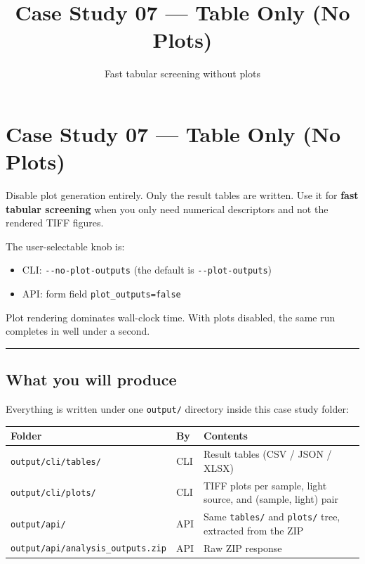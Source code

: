 \documentclass[
  11pt,
]{article}
\title{Case Study 07 — Table Only (No Plots)}
\subtitle{Fast tabular screening without plots}
\author{}
\date{}
\providecommand{\tightlist}{
  \setlength{\itemsep}{0pt}\setlength{\parskip}{0pt}}
\begin{document}
\maketitle

{
\hypersetup{linkcolor=}
\setcounter{tocdepth}{2}
\tableofcontents
}
\hypertarget{case-study-07--table-only-no-plots}{
\section{Case Study 07 --- Table Only (No
Plots)}\label{case-study-07--table-only-no-plots}}

Disable plot generation entirely. Only the result tables are written.
Use it for \textbf{fast tabular screening} when you only need numerical
descriptors and not the rendered TIFF figures.

The user-selectable knob is:

\begin{itemize}
\tightlist
\item
  CLI: \texttt{-\/-no-plot-outputs} (the default is
  \texttt{-\/-plot-outputs})
\item
  API: form field \texttt{plot\_outputs=false}
\end{itemize}

Plot rendering dominates wall-clock time. With plots disabled, the same
run completes in well under a second.

\begin{center}\rule{0.5\linewidth}{0.5pt}\end{center}

\hypertarget{what-you-will-produce}{
\subsection{What you will produce}\label{what-you-will-produce}}

Everything is written under one \texttt{output/} directory inside this
case study folder:

\begin{longtable}[]{@{}lll@{}}
\toprule
Folder & By & Contents \\
\midrule
\endhead
\texttt{output/cli/tables/} & CLI & Result tables (CSV / JSON / XLSX) \\
\texttt{output/cli/plots/} & CLI & TIFF plots per sample, light source,
and (sample, light) pair \\
\texttt{output/api/} & API & Same \texttt{tables/} and \texttt{plots/}
tree, extracted from the ZIP \\
\texttt{output/api/analysis\_outputs.zip} & API & Raw ZIP response \\
\bottomrule
\end{longtable}
\end{document}
